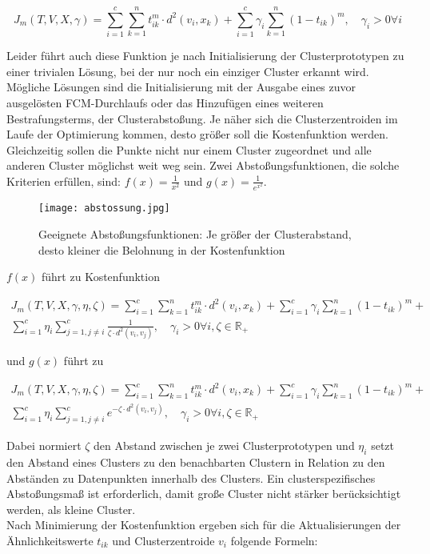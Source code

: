 \documentclass[11pt,ceqn]{book}
\begin{document}
$$J_m(T,V,X,\gamma) = \sum_{i=1}^{c} \sum_{k=1}^{n} t_{ik}^m \cdot d^2(v_i,x_k) + \sum_{i=1}^c  \gamma_i \sum_{k=1}^n (1-t_{ik})^m,\quad \gamma_i>0 \forall i$$

Leider führt auch diese Funktion je nach Initialisierung der Clusterprototypen zu einer trivialen Lösung, bei der nur noch ein einziger Cluster erkannt wird. Mögliche Lösungen sind die Initialisierung mit der Ausgabe eines zuvor ausgelösten FCM-Durchlaufs oder das Hinzufügen eines weiteren Bestrafungsterms, der Clusterabstoßung. Je näher sich die Clusterzentroiden im Laufe der Optimierung kommen, desto größer soll die Kostenfunktion werden. Gleichzeitig sollen die Punkte nicht nur einem Cluster zugeordnet und alle anderen Cluster möglichst weit weg sein. Zwei Abstoßungsfunktionen\cite{cabstossung}, die solche Kriterien erfüllen, sind: $f(x) = \frac{1}{x^2}$ und $g(x) = \frac{1}{e^{x^2}}$.

\begin{figure}[H]
\centering
\texttt{[image: abstossung.jpg]}
 \caption{Geeignete Abstoßungsfunktionen: Je größer der Clusterabstand, desto kleiner die Belohnung in der Kostenfunktion}
\end{figure}

$f(x)$ führt zu Kostenfunktion

\begin{equation}
\begin{split}
J_m(T,V,X,\gamma,\eta,\zeta) = \sum_{i=1}^{c} \sum_{k=1}^{n} t_{ik}^m \cdot d^2(v_i,x_k) + \sum_{i=1}^c  \gamma_i \sum_{k=1}^n (1-t_{ik})^m + \\ \sum_{i=1}^c \eta_i \sum_{j=1,j\neq i}^c \frac{1}{\zeta\cdot d^2(v_i,v_j)},\quad \gamma_i>0 \forall i, \zeta\in \mathbb{R_+}
\end{split}
\end{equation}

und $g(x)$ führt zu 

\begin{equation}
\begin{split}
J_m(T,V,X,\gamma,\eta,\zeta) = \sum_{i=1}^{c} \sum_{k=1}^{n} t_{ik}^m \cdot d^2(v_i,x_k) + \sum_{i=1}^c  \gamma_i \sum_{k=1}^n (1-t_{ik})^m + \\ \sum_{i=1}^c \eta_i \sum_{j=1,j\neq i}^c e^{-\zeta\cdot d^2(v_i,v_j)},\quad \gamma_i>0 \forall i, \zeta\in \mathbb{R_+}
\end{split}
\end{equation}

Dabei normiert $\zeta$ den Abstand zwischen je zwei Clusterprototypen und $\eta_i$ setzt den Abstand eines Clusters zu den benachbarten Clustern in Relation zu den Abständen zu Datenpunkten innerhalb des Clusters. Ein clusterspezifisches Abstoßungsmaß ist erforderlich, damit große Cluster nicht stärker berücksichtigt werden, als kleine Cluster.
\\
Nach Minimierung der Kostenfunktion ergeben sich für die Aktualisierungen der Ähnlichkeitswerte $t_{ik}$ und Clusterzentroide $v_i$ folgende Formeln:
\end{document}
